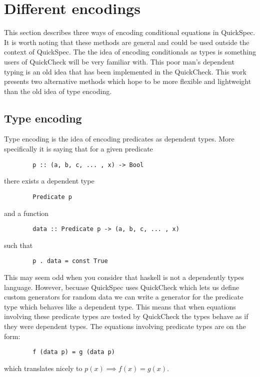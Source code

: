 \section{Different encodings}\label{encodings}

    This section describes three
    ways of encoding conditional
    equations in QuickSpec. It is
    worth noting that these methods
    are general and could be used outside
    the context of QuickSpec. The
    the idea of encoding conditionals
    as types is something users of
    QuickCheck %
    will be very familiar with. This poor
    man's dependent typing is an old idea that has
    been implemented in the QuickCheck.%
    This work presents two alternative methods
    which hope to be more flexible and lightweight
    than the old idea of type encoding.

    \subsection{Type encoding}\label{TE}

        Type encoding is the idea of encoding
        predicates as dependent types. More specifically
        it is saying that for a given predicate
        \begin{verbatim}
        p :: (a, b, c, ... , x) -> Bool
        \end{verbatim}
        there exists a dependent type
        \begin{verbatim}
        Predicate p
        \end{verbatim}
        and a function 
        \begin{verbatim}
        data :: Predicate p -> (a, b, c, ... , x)
        \end{verbatim}
        such that 
        \begin{verbatim}
        p . data = const True
        \end{verbatim}
        This may seem odd when you consider that haskell is not a dependently types
        language. However, becuase QuickSpec uses QuickCheck which lets us define
        custom generators for random data we can write a generator for 
        the predicate type which behaves like a dependent type.
        This means that when equations involving these predicate
        types are tested by QuickCheck the types behave as if they were dependent types.
        The equations involving predicate types are on the form:
        \begin{verbatim}
        f (data p) = g (data p)
        \end{verbatim}
        which translates nicely to $p(x) \implies f(x) = g(x)$.

